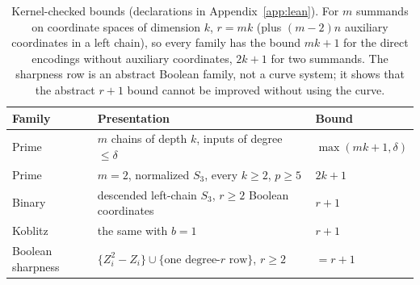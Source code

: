 \documentclass[11pt]{article}
\theoremstyle{definition}\newtheorem{definition}[theorem]{Definition}
\theoremstyle{remark}\newtheorem{remark}[theorem]{Remark}
\begin{document}
\begin{table}[htbp]
\centering\small
\begin{tabular}{lp{7.2cm}l}
\toprule
Family & Presentation & Bound\\
\midrule
Prime & $m$ chains of depth $k$, inputs of degree $\le\delta$ & $\max(mk+1,\delta)$\\
Prime & $m=2$, normalized $S_3$, every $k\ge2$, $p\ge5$ & $2k+1$\\
Binary & descended left-chain $S_3$, $r\ge2$ Boolean coordinates & $r+1$\\
Koblitz & the same with $b=1$ & $r+1$\\
\midrule
Boolean sharpness & $\{Z_i^2-Z_i\}\cup\{\text{one degree-}r\text{ row}\}$, $r\ge2$ & $=r+1$\\
\bottomrule
\end{tabular}
\caption{Kernel-checked bounds (declarations in Appendix~\ref{app:lean}).
For $m$ summands on coordinate spaces of dimension $k$, $r=mk$ (plus
$(m-2)n$ auxiliary coordinates in a left chain), so every family has the
bound $mk+1$ for the direct encodings without auxiliary coordinates, $2k+1$
for two summands. The sharpness row is an
abstract Boolean family, not a curve system; it shows that the abstract
$r+1$ bound cannot be improved without using the curve.}
\label{tab:bounds}
\end{table}
\end{document}
